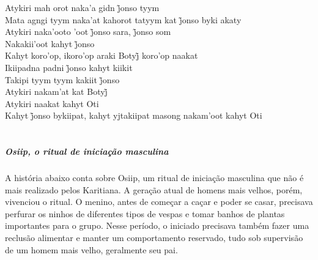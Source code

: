 \smallskip
 \begin{center}\end{center}
 \smallskip
\noindent Atykiri mah orot naka’a gidn j̃onso tyym\\
Mata agngi tyym naka’at kahorot tatyym kat j̃onso byki akaty\\
Atykiri naka’ooto ’oot j̃onso sara, j̃onso som\\
Nakakii’oot kahyt j̃onso\\
Kahyt koro’op, ikoro’op araki Botyj̃ koro’op naakat\\
Ikiipadna padni j̃onso kahyt kiikit\\
Takipi tyym tyym kakiit j̃onso\\
Atykiri nakam’at kat Botyj̃\\
Atykiri naakat kahyt Oti\\
Kahyt j̃onso bykiipat, kahyt yjtakiipat masong nakam’oot kahyt Oti

\chapter*{}
\thispagestyle{empty}

\vspace*{\fill}

\paragraph{Osiip, o ritual de iniciação masculina}
 A história abaixo conta sobre Osiip, um ritual de iniciação masculina que
 não é mais realizado pelos Karitiana. A geração atual de homens mais
 velhos, porém, vivenciou o ritual. O menino, antes de começar a caçar e
 poder se casar, precisava perfurar os ninhos de diferentes tipos de
 vespas e tomar banhos de plantas importantes para o grupo. Nesse
 período, o iniciado precisava também fazer uma reclusão alimentar e
 manter um comportamento reservado, tudo sob supervisão de um homem mais
 velho, geralmente seu pai.

